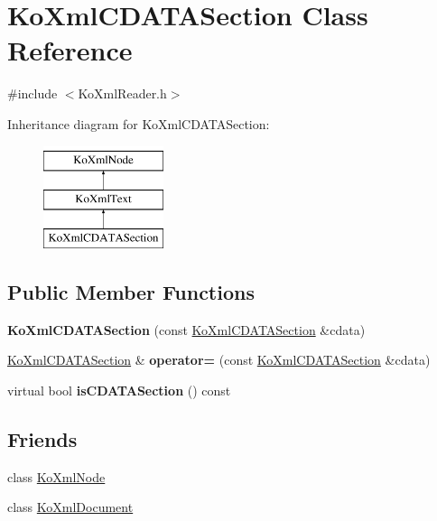 \hypertarget{classKoXmlCDATASection}{
\section{KoXmlCDATASection Class Reference}
\label{classKoXmlCDATASection}
}


{\ttfamily \#include $<$KoXmlReader.h$>$}

Inheritance diagram for KoXmlCDATASection:\begin{figure}[H]
\begin{center}
\leavevmode
\includegraphics[height=3cm]{classKoXmlCDATASection}
\end{center}
\end{figure}
\subsection*{Public Member Functions}
\begin{DoxyCompactItemize}
\item 
\hypertarget{classKoXmlCDATASection_a9f69382bc27884731599f49763926343}{
{\bfseries KoXmlCDATASection} (const \hyperlink{classKoXmlCDATASection}{KoXmlCDATASection} \&cdata)}
\label{classKoXmlCDATASection_a9f69382bc27884731599f49763926343}

\item 
\hypertarget{classKoXmlCDATASection_a2380c3e02c07e9f31ee30c97de202c06}{
\hyperlink{classKoXmlCDATASection}{KoXmlCDATASection} \& {\bfseries operator=} (const \hyperlink{classKoXmlCDATASection}{KoXmlCDATASection} \&cdata)}
\label{classKoXmlCDATASection_a2380c3e02c07e9f31ee30c97de202c06}

\item 
\hypertarget{classKoXmlCDATASection_af5d118d633fa233c8a7c9a3fad7ae5fd}{
virtual bool {\bfseries isCDATASection} () const }
\label{classKoXmlCDATASection_af5d118d633fa233c8a7c9a3fad7ae5fd}

\end{DoxyCompactItemize}
\subsection*{Friends}
\begin{DoxyCompactItemize}
\item 
\hypertarget{classKoXmlCDATASection_a6c97883f92c7cbf2ecdf17db6cea8297}{
class \hyperlink{classKoXmlCDATASection_a6c97883f92c7cbf2ecdf17db6cea8297}{KoXmlNode}}
\label{classKoXmlCDATASection_a6c97883f92c7cbf2ecdf17db6cea8297}

\item 
\hypertarget{classKoXmlCDATASection_a7f0a67ef52ddc6542737225a82e4f487}{
class \hyperlink{classKoXmlCDATASection_a7f0a67ef52ddc6542737225a82e4f487}{KoXmlDocument}}
\label{classKoXmlCDATASection_a7f0a67ef52ddc6542737225a82e4f487}

\end{DoxyCompactItemize}


